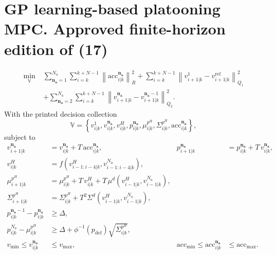 \documentclass{article}
\begin{document}
\section*{GP learning-based platooning MPC. Approved finite-horizon edition of (17)}
\begin{equation}
\begin{aligned}
\min_{\mathbb V}\;&
\sum_{\mathbf{n_a}=1}^{N_a}\sum_{i=k}^{k+N-1}
 \left\|\mathrm{acc}_{i|k}^{\mathbf{n_a}}\right\|_R^2
+\sum_{i=k}^{k+N-1}
 \left\|v_{i+1|k}^{1}-v_{i+1|k}^{\mathrm{ref}}\right\|_{Q_1}^2\\
&+\sum_{\mathbf{n_a}=2}^{N_a}\sum_{i=k}^{k+N-1}
 \left\|v_{i+1|k}^{\mathbf{n_a}}-v_{i+1|k}^{\mathbf{n_a}-1}\right\|_{Q_2}^2 .
\end{aligned}\tag{17a}
\end{equation}
With the printed decision collection
\[
\mathbb V=\left\{v_{i|k}^{1},v_{i|k}^{\mathbf{n_a}},v_{i|k}^{H},
 p_{i|k}^{\mathbf{n_a}},\mu_{i|k}^{p^H},\Sigma_{i|k}^{p^H},
 \mathrm{acc}_{i|k}^{\mathbf{n_a}}\right\},
\]
subject to
\begin{align}
v_{i+1|k}^{\mathbf{n_a}}&=v_{i|k}^{\mathbf{n_a}}+T\,\mathrm{acc}_{i|k}^{\mathbf{n_a}},
& p_{i+1|k}^{\mathbf{n_a}}&=p_{i|k}^{\mathbf{n_a}}+T\,v_{i|k}^{\mathbf{n_a}},\tag{17b}\\
v_{i|k}^{H}&=f\left(v_{i-1:i-4|k}^{H},v_{i-1:i-4|k}^{N_a}\right),\tag{17c}\\
\mu_{i+1|k}^{p^H}&=\mu_{i|k}^{p^H}+T\,v_{i|k}^{H}
 +T\,\mu^d\left(v_{i-1|k}^{H},v_{i-1|k}^{N_a}\right),\tag{17d}\\
\Sigma_{i+1|k}^{p^H}&=\Sigma_{i|k}^{p^H}
 +T^2\Sigma^d\left(v_{i-1|k}^{H},v_{i-1|k}^{N_a}\right),\tag{17e}\\
p_{i|k}^{\mathbf{n_a}-1}-p_{i|k}^{\mathbf{n_a}}&\geq\Delta,\tag{17f}\\
p_{i|k}^{N_a}-\mu_{i|k}^{p^H}&\geq\Delta+\phi^{-1}(p_{\mathrm{def}})
 \sqrt{\Sigma_{i|k}^{p^H}},\tag{17g}\\
v_{\min}\leq v_{i|k}^{\mathbf{n_a}}&\leq v_{\max},
&\mathrm{acc}_{\min}\leq\mathrm{acc}_{i|k}^{\mathbf{n_a}}&\leq\mathrm{acc}_{\max}.\tag{17h}
\end{align}
\end{document}

